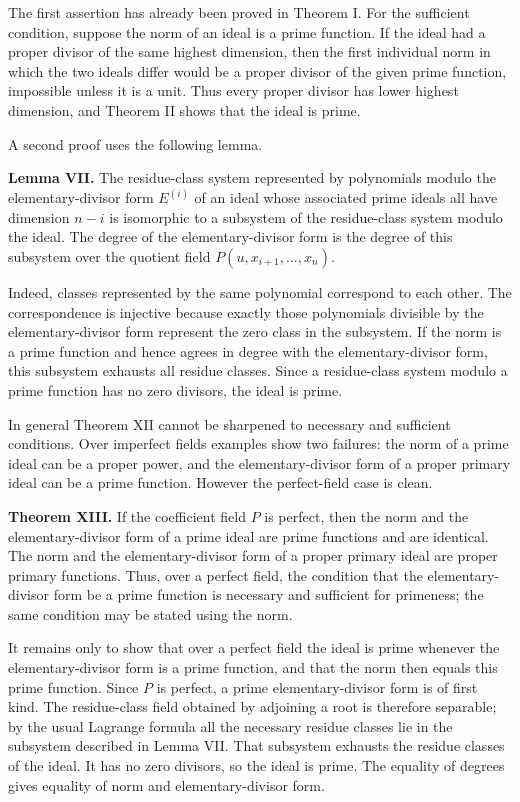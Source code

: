 \documentclass[11pt]{article}
\begin{document}
The first assertion has already been proved in Theorem I. For the sufficient condition, suppose the norm of an ideal is a prime function. If the ideal had a proper divisor of the same highest dimension, then the first individual norm in which the two ideals differ would be a proper divisor of the given prime function, impossible unless it is a unit. Thus every proper divisor has lower highest dimension, and Theorem II shows that the ideal is prime.

A second proof uses the following lemma.

\textbf{Lemma VII.} The residue-class system represented by polynomials modulo the elementary-divisor form $E^{(i)}$ of an ideal whose associated prime ideals all have dimension $n-i$ is isomorphic to a subsystem of the residue-class system modulo the ideal. The degree of the elementary-divisor form is the degree of this subsystem over the quotient field $P(u,x_{i+1},\ldots,x_n)$.

Indeed, classes represented by the same polynomial correspond to each other. The correspondence is injective because exactly those polynomials divisible by the elementary-divisor form represent the zero class in the subsystem. If the norm is a prime function and hence agrees in degree with the elementary-divisor form, this subsystem exhausts all residue classes. Since a residue-class system modulo a prime function has no zero divisors, the ideal is prime.

In general Theorem XII cannot be sharpened to necessary and sufficient conditions. Over imperfect fields examples show two failures: the norm of a prime ideal can be a proper power, and the elementary-divisor form of a proper primary ideal can be a prime function. However the perfect-field case is clean.

\textbf{Theorem XIII.} If the coefficient field $P$ is perfect, then the norm and the elementary-divisor form of a prime ideal are prime functions and are identical. The norm and the elementary-divisor form of a proper primary ideal are proper primary functions. Thus, over a perfect field, the condition that the elementary-divisor form be a prime function is necessary and sufficient for primeness; the same condition may be stated using the norm.

It remains only to show that over a perfect field the ideal is prime whenever the elementary-divisor form is a prime function, and that the norm then equals this prime function. Since $P$ is perfect, a prime elementary-divisor form is of first kind. The residue-class field obtained by adjoining a root is therefore separable; by the usual Lagrange formula all the necessary residue classes lie in the subsystem described in Lemma VII. That subsystem exhausts the residue classes of the ideal. It has no zero divisors, so the ideal is prime. The equality of degrees gives equality of norm and elementary-divisor form.
\end{document}
